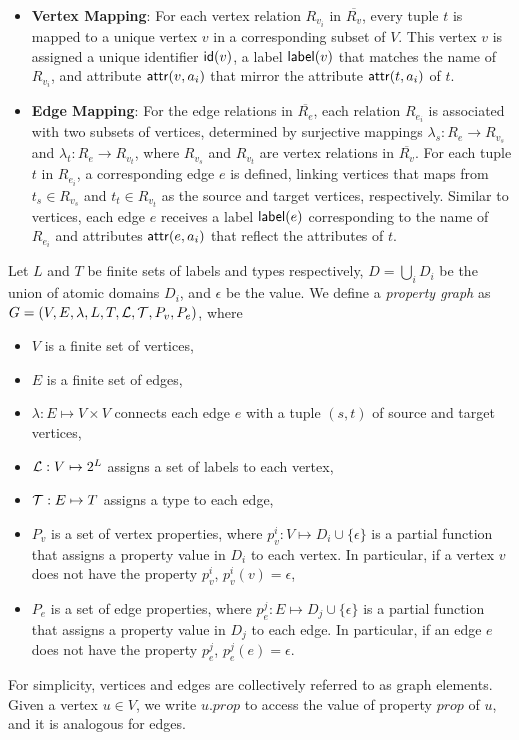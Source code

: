 \begin{itemize}
\item \textbf{Vertex Mapping}: For each vertex relation \(R_{v_i}\) in \(\overline{R_v}\), every tuple \(t\) is mapped to a unique vertex \(v\) in a corresponding subset of \(V\). This vertex \(v\) is assigned a unique identifier \({\mathsf{id}}(v)\), a label \({\mathsf{label}}(v)\) that matches the name of \(R_{v_i}\), and attribute \({\mathsf{attr}}(v, a_i)\) that mirror the attribute \({\mathsf{attr}}(t, a_i)\) of \(t\).

\item \textbf{Edge Mapping}: For the edge relations in \(\overline{R_e}\), each relation \(R_{e_i}\) is associated with two subsets of vertices, determined by surjective mappings \(\lambda_s: R_{e} \to R_{v_s}\) and \(\lambda_t: R_{e} \to R_{v_t}\), where \(R_{v_s}\) and \(R_{v_t}\) are vertex relations in \(\overline{R_v}\). For each tuple \(t\) in \(R_{e_i}\), a corresponding edge \(e\) is defined, linking vertices that \rgmapping maps from \(t_s \in R_{v_s}\) and \(t_t \in R_{v_t}\) as the source and target vertices, respectively. Similar to vertices, each edge \(e\) receives a label \({\mathsf{label}}(e)\) corresponding to the name of \(R_{e_i}\) and attributes \({\mathsf{attr}}(e, a_i)\) that reflect the attributes of \(t\).

\end{itemize}


Let $L$ and $T$ be finite sets of labels and types respectively, $D = \bigcup_i D_i$ be the union of atomic domains $D_i$, and $\epsilon$ be the  value. We define a \textit{property graph} as $G = (V, E, \lambda, L, T, \mathcal{L}, \mathcal{T}, P_v, P_e)$, where
\begin{itemize}
    \item $V$ is a finite set of vertices,
    \item $E$ is a finite set of edges,
    \item $\lambda: E \mapsto V \times V$ connects each edge $e$ with a tuple $(s, t)$ of source and target vertices,
    \item $\mathcal{L}: V \mapsto 2^L$ assigns a set of labels to each vertex,
    \item $\mathcal{T}: E \mapsto T$ assigns a type to each edge,
    \item $P_v$ is a set of vertex properties, where $p_v^i: V \mapsto D_i \cup \{\epsilon\}$ is a partial function that assigns a property value in $D_i$ to each vertex.
    In particular, if a vertex $v$ does not have the property $p_v^i$, $p_v^i(v) = \epsilon$,
    \item $P_e$ is a set of edge properties, where $p_e^j: E \mapsto D_j \cup \{\epsilon\}$ is a partial function that assigns a property value in $D_j$ to each edge.
    In particular, if an edge $e$ does not have the property $p_e^j$, $p_e^j(e) = \epsilon$.
\end{itemize}
For simplicity, vertices and edges are collectively referred to as graph elements.
Given a vertex $u \in V$, we write $u.prop$ to access the value of property $prop$ of $u$, and it is analogous for edges.




